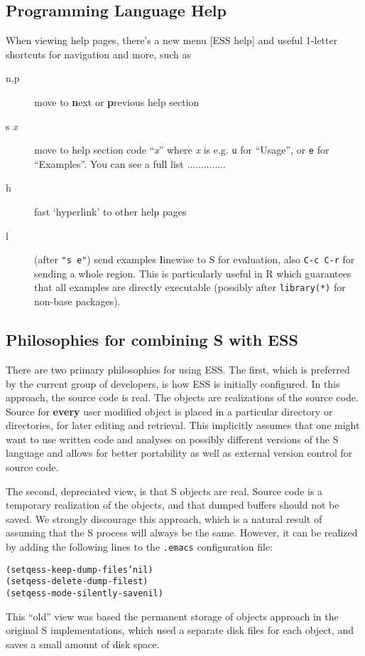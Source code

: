 \documentclass{article}
\newenvironment{Salltt}{\small\begin{alltt}}{\end{alltt}}
\begin{document}
\subsection{Programming Language Help}
\label{sec:S:help}
When viewing help pages, there's a new menu \textsf{[ESS help]} and
useful 1-letter shortcuts for navigation and more, such as
\begin{description}
\item[n,p] move to \textbf{n}ext or \textbf{p}revious help section
\item[s \textit{x}] move to help section code ``\textit{x}'' where
  \textit{x} is e.g. \texttt{u} for ``Usage'', or \texttt{e} for
  ``Examples''.  You can see a full list ..............

\item[h] fast `hyperlink' to other help pages

\item[l] (after \texttt{"s e"}) send examples \textbf{l}inewise to S for
  evaluation, also \texttt{C-c C-r} for sending a whole region.  This 
  is particularly useful in R which guarantees that all examples are
  directly executable (possibly after \texttt{library(*)} for non-base
  packages).
\end{description}

\subsection{Philosophies for combining S with ESS}
\label{sec:S:philosophy}

There are two primary philosophies for using ESS.  The first, which is
preferred by the current group of developers, is how ESS is initially
configured.  In this approach, the source code is real.  The objects
are realizations of the source code.  Source for \textbf{every} user
modified object is placed in a particular directory or directories,
for later editing and retrieval.  This implicitly assumes that one
might want to use written code and analyses on possibly different
versions of the S language and allows for better portability as well
as external version control for source code.

The second, depreciated view, is that S objects are real.  Source code
is a temporary realization of the objects, and that dumped buffers
should not be saved.  We strongly discourage this approach, which is a
natural result of assuming that the S process will always be the same.
However, it can be realized by adding the following lines to the
\texttt{.emacs} configuration file:
\begin{Salltt}
  (setq ess-keep-dump-files 'nil)
  (setq ess-delete-dump-files t)
  (setq ess-mode-silently-save nil)
\end{Salltt}
This ``old'' view was based the permanent storage of objects approach
in the original S implementations, which used a separate disk files
for each object, and saves a small amount of disk space.  
\end{document}
